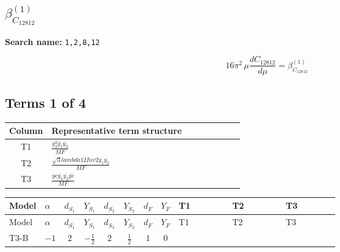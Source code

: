 \documentclass[8pt]{article}
\begin{document}
\begin{landscape}
\section*{$\beta_{C_{12812}}^{(1)}$}
\noindent\textbf{Search name: }\texttt{1,2,8,12}\par\smallskip
\[16\pi^2\,\mu\frac{d C_{12812}}{d\mu}=\beta_{C_{12812}}^{(1)}\]
\subsection*{Terms 1 of 4}
\begin{center}
\begin{tabular}{@{}c >{\raggedright\arraybackslash}p{0.82\linewidth}@{}}
\toprule
Column & Representative term structure \\
\midrule
T1 & \(\displaystyle \frac{g_{2}^{2} \overline{y_{1}} \overline{y_{2}}}{MF}\) \\
\midrule
T2 & \(\displaystyle \frac{\sqrt{3} lambda12Inv2 \overline{y_{1}} \overline{y_{2}}}{MF}\) \\
\midrule
T3 & \(\displaystyle \frac{ye \overline{y_{1}} \overline{y_{2}} \overline{ye}}{MF}\) \\
\midrule
\bottomrule
\end{tabular}
\end{center}
\smallskip
\tiny
\begin{longtable}{@{}llcccccc >{\raggedright\arraybackslash}p{0.21\linewidth} >{\raggedright\arraybackslash}p{0.21\linewidth} >{\raggedright\arraybackslash}p{0.21\linewidth}@{}}
\toprule
Model & $\alpha$ & $d_{S_1}$ & $Y_{S_1}$ & $d_{S_2}$ & $Y_{S_2}$ & $d_F$ & $Y_F$ & T1 & T2 & T3 \\
\midrule
\endfirsthead
\toprule
Model & $\alpha$ & $d_{S_1}$ & $Y_{S_1}$ & $d_{S_2}$ & $Y_{S_2}$ & $d_F$ & $Y_F$ & T1 & T2 & T3 \\
\midrule
\endhead
T3-B & $-1$ & $2$ & $-\frac{1}{2}$ & $2$ & $\frac{1}{2}$ & $1$ & $0$ & \scriptsize\adjustbox{max width=\linewidth}{$\begin{gathered} - \frac{3 g_{2}^{2} \overline{y_{1}} \overline{y_{2}}}{8 MF}\end{gathered}$} & \scriptsize\adjustbox{max width=\linewidth}{$\begin{gathered} - \frac{\sqrt{3} lambda12Inv2 \overline{y_{1}} \overline{y_{2}}}{6 MF}\end{gathered}$} & \scriptsize\adjustbox{max width=\linewidth}{$\begin{gathered} \frac{ye \overline{y_{1}} \overline{y_{2}} \overline{ye}}{8 MF}\end{gathered}$} \\

\end{longtable}
\end{landscape}
\end{document}
